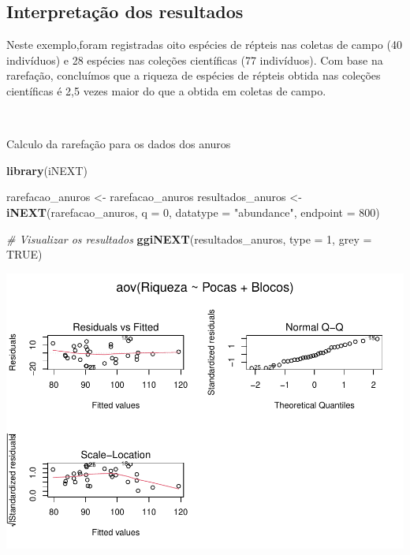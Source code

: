 \documentclass[
]{book}
\newenvironment{Shaded}{\begin{snugshade}}{\end{snugshade}}
\newcommand{\CommentTok}[1]{\textcolor[rgb]{0.56,0.35,0.01}{\textit{#1}}}
\newcommand{\DataTypeTok}[1]{\textcolor[rgb]{0.13,0.29,0.53}{#1}}
\newcommand{\DecValTok}[1]{\textcolor[rgb]{0.00,0.00,0.81}{#1}}
\newcommand{\KeywordTok}[1]{\textcolor[rgb]{0.13,0.29,0.53}{\textbf{#1}}}
\newcommand{\NormalTok}[1]{#1}
\newcommand{\OtherTok}[1]{\textcolor[rgb]{0.56,0.35,0.01}{#1}}
\newcommand{\StringTok}[1]{\textcolor[rgb]{0.31,0.60,0.02}{#1}}
\begin{document}
\hypertarget{interpretauxe7uxe3o-dos-resultados-1}{%
\subsection{Interpretação dos resultados}\label{interpretauxe7uxe3o-dos-resultados-1}}

Neste exemplo,foram registradas oito espécies de répteis nas coletas de campo (40 indivíduos) e 28 espécies nas coleções científicas (77 indivíduos). Com base na rarefação, concluímos que a riqueza de espécies de répteis obtida nas coleções científicas é 2,5 vezes maior do que a obtida em coletas de campo.

~

Calculo da rarefação para os dados dos anuros

\begin{Shaded}
\begin{Highlighting}[]
\KeywordTok{library}\NormalTok{(iNEXT)}

\NormalTok{rarefacao_anuros <-}\StringTok{ }\NormalTok{rarefacao_anuros}
\NormalTok{resultados_anuros <-}\StringTok{ }\KeywordTok{iNEXT}\NormalTok{(rarefacao_anuros, }\DataTypeTok{q =} \DecValTok{0}\NormalTok{, }\DataTypeTok{datatype =} \StringTok{"abundance"}\NormalTok{, }\DataTypeTok{endpoint =} \DecValTok{800}\NormalTok{)}

\CommentTok{# Visualizar os resultados }
\KeywordTok{ggiNEXT}\NormalTok{(resultados_anuros, }\DataTypeTok{type =} \DecValTok{1}\NormalTok{, }\DataTypeTok{grey =} \OtherTok{TRUE}\NormalTok{)}
\end{Highlighting}
\end{Shaded}

\includegraphics{livro_r_ecologia_files/figure-latex/unnamed-chunk-19-1.pdf}
\end{document}
